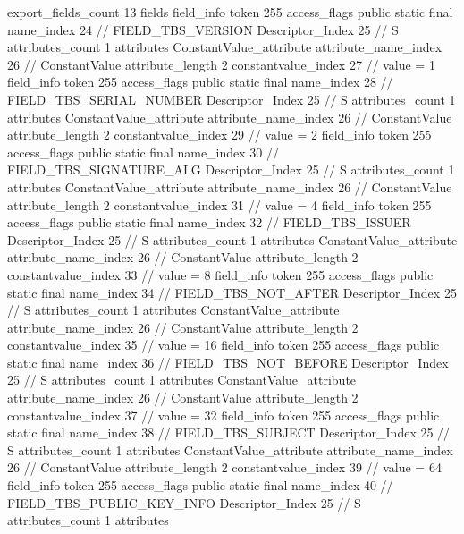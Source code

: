 {{{{			}
			export_fields_count	13
			fields {
			field_info {
				token	255
				access_flags	public static final
				name_index	24		// FIELD_TBS_VERSION
				Descriptor_Index	25		// S
				attributes_count	1
				attributes {
				ConstantValue_attribute {
					attribute_name_index	26		// ConstantValue
					attribute_length	2
					constantvalue_index	27		// value = 1
				}
				}
			}
			field_info {
				token	255
				access_flags	public static final
				name_index	28		// FIELD_TBS_SERIAL_NUMBER
				Descriptor_Index	25		// S
				attributes_count	1
				attributes {
				ConstantValue_attribute {
					attribute_name_index	26		// ConstantValue
					attribute_length	2
					constantvalue_index	29		// value = 2
				}
				}
			}
			field_info {
				token	255
				access_flags	public static final
				name_index	30		// FIELD_TBS_SIGNATURE_ALG
				Descriptor_Index	25		// S
				attributes_count	1
				attributes {
				ConstantValue_attribute {
					attribute_name_index	26		// ConstantValue
					attribute_length	2
					constantvalue_index	31		// value = 4
				}
				}
			}
			field_info {
				token	255
				access_flags	public static final
				name_index	32		// FIELD_TBS_ISSUER
				Descriptor_Index	25		// S
				attributes_count	1
				attributes {
				ConstantValue_attribute {
					attribute_name_index	26		// ConstantValue
					attribute_length	2
					constantvalue_index	33		// value = 8
				}
				}
			}
			field_info {
				token	255
				access_flags	public static final
				name_index	34		// FIELD_TBS_NOT_AFTER
				Descriptor_Index	25		// S
				attributes_count	1
				attributes {
				ConstantValue_attribute {
					attribute_name_index	26		// ConstantValue
					attribute_length	2
					constantvalue_index	35		// value = 16
				}
				}
			}
			field_info {
				token	255
				access_flags	public static final
				name_index	36		// FIELD_TBS_NOT_BEFORE
				Descriptor_Index	25		// S
				attributes_count	1
				attributes {
				ConstantValue_attribute {
					attribute_name_index	26		// ConstantValue
					attribute_length	2
					constantvalue_index	37		// value = 32
				}
				}
			}
			field_info {
				token	255
				access_flags	public static final
				name_index	38		// FIELD_TBS_SUBJECT
				Descriptor_Index	25		// S
				attributes_count	1
				attributes {
				ConstantValue_attribute {
					attribute_name_index	26		// ConstantValue
					attribute_length	2
					constantvalue_index	39		// value = 64
				}
				}
			}
			field_info {
				token	255
				access_flags	public static final
				name_index	40		// FIELD_TBS_PUBLIC_KEY_INFO
				Descriptor_Index	25		// S
				attributes_count	1
				attributes {
}}}}}}
